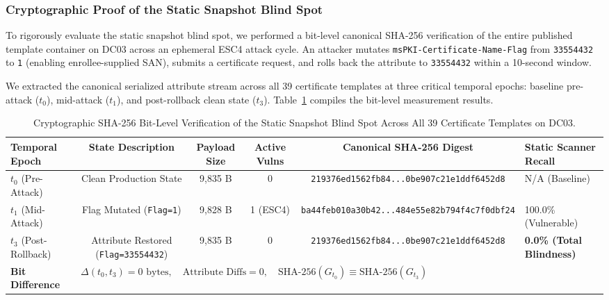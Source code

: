 \subsubsection{Cryptographic Proof of the Static Snapshot Blind Spot}
\label{sec:sha256_blindspot_proof}
To rigorously evaluate the static snapshot blind spot, we performed a bit-level canonical SHA-256 verification of the entire published template container on DC03 across an ephemeral ESC4 attack cycle. An attacker mutates \texttt{msPKI-Certificate-Name-Flag} from \texttt{33554432} to \texttt{1} (enabling enrollee-supplied SAN), submits a certificate request, and rolls back the attribute to \texttt{33554432} within a 10-second window.

We extracted the canonical serialized attribute stream across all 39 certificate templates at three critical temporal epochs: baseline pre-attack ($t_0$), mid-attack ($t_1$), and post-rollback clean state ($t_3$). Table~\ref{tab:sha256_blindspot_proof} compiles the bit-level measurement results.

\begin{table}[htbp]
\centering
\small
\caption{Cryptographic SHA-256 Bit-Level Verification of the Static Snapshot Blind Spot Across All 39 Certificate Templates on DC03.}
\label{tab:sha256_blindspot_proof}
\begin{tabularx}{\textwidth}{lccccX}
\toprule
\textbf{Temporal Epoch} & \textbf{State Description} & \textbf{Payload Size} & \textbf{Active Vulns} & \textbf{Canonical SHA-256 Digest} & \textbf{Static Scanner Recall} \\
\midrule
$t_0$ (Pre-Attack) & Clean Production State & 9,835 B & 0 & \texttt{219376ed1562fb84...0be907c21e1ddf6452d8} & N/A (Baseline) \\
$t_1$ (Mid-Attack) & Flag Mutated (\texttt{Flag=1}) & 9,828 B & 1 (ESC4) & \texttt{ba44feb010a30b42...484e55e82b794f4c7f0dbf24} & 100.0\% (Vulnerable) \\
$t_3$ (Post-Rollback) & Attribute Restored (\texttt{Flag=33554432}) & 9,835 B & 0 & \texttt{219376ed1562fb84...0be907c21e1ddf6452d8} & \textbf{0.0\% (Total Blindness)} \\
\midrule
\textbf{Bit Difference} & \multicolumn{5}{l}{$\Delta(t_0, t_3) = 0\text{ bytes}, \quad \text{Attribute Diffs} = 0, \quad \text{SHA-256}(G_{t_0}) \equiv \text{SHA-256}(G_{t_3})$} \\
\bottomrule
\end{tabularx}
\end{table}

